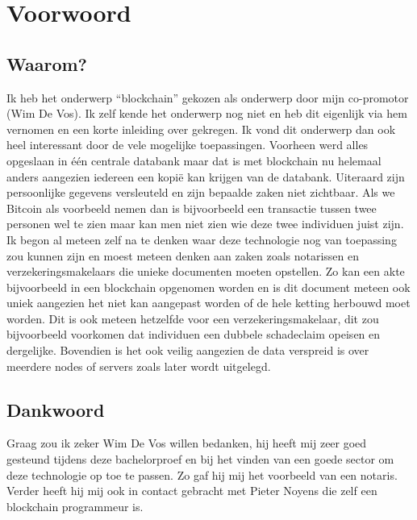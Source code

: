 
\chapter*{Voorwoord}
\label{ch:voorwoord}


\section*{Waarom?}
Ik heb het onderwerp ``blockchain'' gekozen als onderwerp door mijn co-promotor (Wim De Vos). Ik zelf kende het onderwerp nog niet en heb dit eigenlijk via hem vernomen en een korte inleiding over gekregen. Ik vond dit onderwerp dan ook heel interessant door de vele mogelijke toepassingen. Voorheen werd alles opgeslaan in één centrale databank maar dat is met blockchain nu helemaal anders aangezien iedereen een kopië kan krijgen van de databank. Uiteraard zijn persoonlijke gegevens versleuteld en zijn bepaalde zaken niet zichtbaar. Als we Bitcoin als voorbeeld nemen dan is bijvoorbeeld een transactie tussen twee personen wel te zien maar kan men niet zien wie deze twee individuen juist zijn. Ik begon al meteen zelf na te denken waar deze technologie nog van toepassing zou kunnen zijn en moest meteen denken aan zaken zoals notarissen en verzekeringsmakelaars die unieke documenten moeten opstellen. Zo kan een akte bijvoorbeeld in een blockchain opgenomen worden en is dit document meteen ook uniek aangezien het niet kan aangepast worden of de hele ketting herbouwd moet worden. Dit is ook meteen hetzelfde voor een verzekeringsmakelaar, dit zou bijvoorbeeld voorkomen dat individuen een dubbele schadeclaim opeisen en dergelijke. Bovendien is het ook veilig aangezien de data verspreid is over meerdere nodes of servers zoals later wordt uitgelegd.

\newpage
\section*{Dankwoord}
Graag zou ik zeker Wim De Vos willen bedanken, hij heeft mij zeer goed gesteund tijdens deze bachelorproef en bij het vinden van een goede sector om deze technologie op toe te passen. Zo gaf hij mij het voorbeeld van een notaris. Verder heeft hij mij ook in contact gebracht met Pieter Noyens die zelf een blockchain programmeur is.

